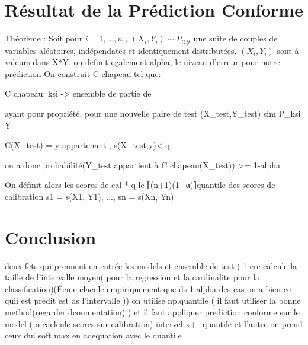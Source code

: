 \documentclass[a4paper,12pt]{article}%
\begin{document}
\section{Résultat de la Prédiction Conforme}
Théorème : Soit pour $i= 1,...,n$ ,  
 $(X_i, Y_i) \sim P_{\mathcal{X}\mathcal{Y}}$ une suite de couples de variables aléatoires, indépendates et identiquement distributées. $(X_i, Y_i)$ sont à valeurs dans X*Y. on definit egalement alpha, le niveau d'erreur pour notre prédiction
 On construit C chapeau tel que:
 
 
 C chapeau: ksi -> ensemble de partie de 

 ayant pour propriété, pour une nouvelle paire de test (X_test,Y_test) sim P_ksi Y

 C(X_test) = {y appartenant , s(X_test,y)< q}
 
 

 on a donc 
 probabilité({Y_test appartient à C chapeau(X_test)}) >= 1-alpha


 
 On définit alors les scores de cal
 * q le ⌈(n+1)(1−α)⌉quantile des scores de calibration s1 = s(X1, Y1), ..., sn = s(Xn, Yn)
\section{Conclusion}
deux fcts qui prennent en entrée les models et ensemble de test ( 1 ere calcule la taille de l'intervalle moyen( pour la regression et la cardinalite pour  la classification)(Éeme clacule empiriquement que ds 1-alpha des cas on a bien ce quii est prédit est ds l'intervalle ))
on utilise  np.quantile ( il faut utiliser la bonne method(regarder dcoumentation) )
et il faut appliquer prediction conforme sur le model ( o caclcule scores sur calibration)
intervel x+_quantile et l'autre on prend ceux dui soft max en aqequation avec le quantile
\end{document}
